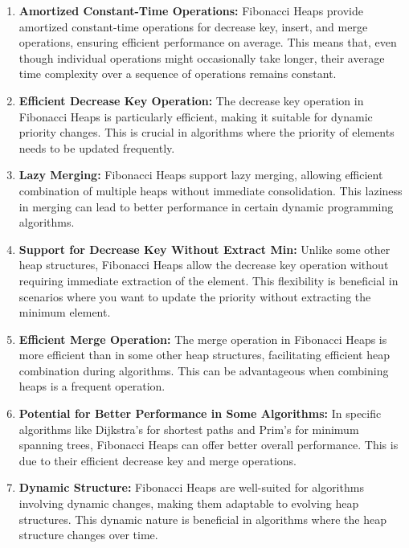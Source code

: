\documentclass[12pt, a4paper]{article}
\begin{document}
\begin{enumerate}
	\item \textbf{Amortized Constant-Time Operations:} Fibonacci Heaps provide amortized constant-time operations for decrease key, insert, and merge operations, ensuring efficient performance on average. This means that, even though individual operations might occasionally take longer, their average time complexity over a sequence of operations remains constant.
	
	\item \textbf{Efficient Decrease Key Operation:} The decrease key operation in Fibonacci Heaps is particularly efficient, making it suitable for dynamic priority changes. This is crucial in algorithms where the priority of elements needs to be updated frequently.
	
	\item \textbf{Lazy Merging:} Fibonacci Heaps support lazy merging, allowing efficient combination of multiple heaps without immediate consolidation. This laziness in merging can lead to better performance in certain dynamic programming algorithms.
	
	\item \textbf{Support for Decrease Key Without Extract Min:} Unlike some other heap structures, Fibonacci Heaps allow the decrease key operation without requiring immediate extraction of the element. This flexibility is beneficial in scenarios where you want to update the priority without extracting the minimum element.
	
	\item \textbf{Efficient Merge Operation:} The merge operation in Fibonacci Heaps is more efficient than in some other heap structures, facilitating efficient heap combination during algorithms. This can be advantageous when combining heaps is a frequent operation.
	
	\item \textbf{Potential for Better Performance in Some Algorithms:} In specific algorithms like Dijkstra's for shortest paths and Prim's for minimum spanning trees, Fibonacci Heaps can offer better overall performance. This is due to their efficient decrease key and merge operations.
	
	\item \textbf{Dynamic Structure:} Fibonacci Heaps are well-suited for algorithms involving dynamic changes, making them adaptable to evolving heap structures. This dynamic nature is beneficial in algorithms where the heap structure changes over time.\cite{cormen2022introduction}
\end{enumerate}
\end{document}

